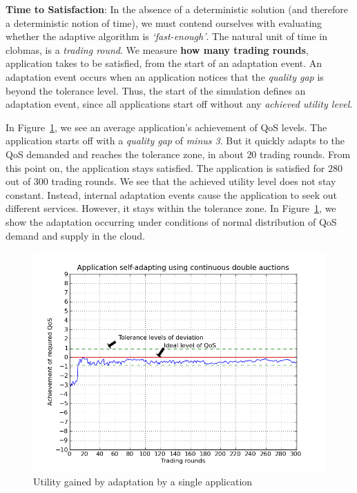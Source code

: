 \documentclass[10pt,journal,compsoc]{IEEEtran}
\begin{document}
\textbf{Time to Satisfaction}: In the absence of a deterministic solution (and therefore a deterministic notion of time), we must contend ourselves with evaluating whether the adaptive algorithm is \textit{`fast-enough'}.  The natural unit of time in clobmas, is a \textit{trading round}.  We measure \textbf{how many trading rounds}, application takes to be satisfied, from the start of an adaptation event. An adaptation event occurs when an application notices that the \textit{quality gap} is beyond the tolerance level. Thus, the start of the simulation defines an adaptation event, since all applications start off without any \textit{achieved utility level}.
	
In Figure~\ref{fig:goodness_cda}, we see an average application's achievement of QoS levels. The application starts off with a \textit{quality gap} of \textit{minus 3}. But it quickly adapts to the QoS demanded and reaches the tolerance zone, in about $20$ trading rounds. From this point on, the application stays satisfied. The application is satisfied for $280$ out of $300$ trading rounds. We see that the achieved utility level does not stay constant. Instead, internal adaptation events cause the application to seek out different services. However, it stays within the tolerance zone. In Figure~\ref{fig:goodness_cda}, we show the adaptation occurring  under conditions of normal distribution of QoS demand and supply in the cloud. 
 \begin{figure}[h]
 	\centering
    \includegraphics[scale=0.45]{graphs/Single_App_Self_Adaptation_Across_Rounds_With_QA_Change.png}
    \caption{Utility gained by adaptation by a single application \label{fig:goodness_cda}}
\end{figure}	 
\end{document}
